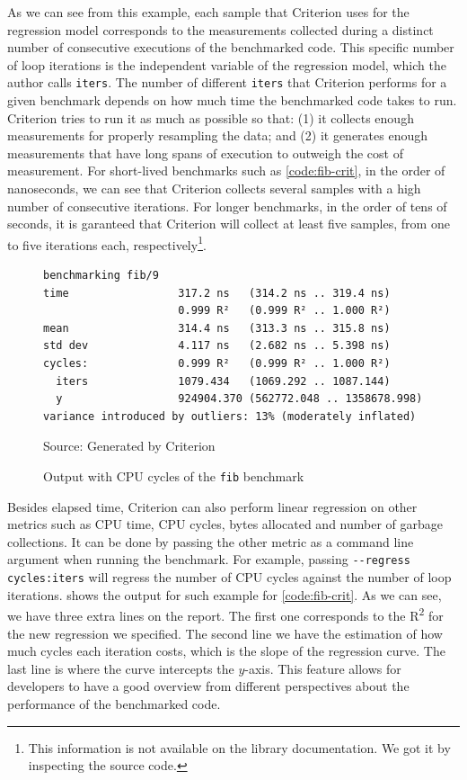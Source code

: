 As we can see from this example, each sample that Criterion uses for the regression model corresponds to the measurements collected during a distinct number of consecutive executions of the benchmarked code. This specific number of loop iterations is the independent variable of the regression model, which the author calls \texttt{iters}. The number of different \texttt{iters} that Criterion performs for a given benchmark depends on how much time the benchmarked code takes to run. Criterion tries to run it as much as possible so that: (1) it collects enough measurements for properly resampling the data; and (2) it generates enough measurements that have long spans of execution to outweigh the cost of measurement. For short-lived benchmarks such as \autoref{code:fib-crit}, in the order of nanoseconds, we can see that Criterion collects several samples with a high number of consecutive iterations. For longer benchmarks, in the order of tens of seconds, it is garanteed that Criterion will collect at least five samples, from one to five iterations each, respectively\footnote{This information is not available on the library documentation. We got it by inspecting the source code.}.

\begin{figure}[htp]
  \centering
  \caption{Output with CPU cycles of the \texttt{fib} benchmark}
  \begin{verbatim}
benchmarking fib/9
time                 317.2 ns   (314.2 ns .. 319.4 ns)
                     0.999 R²   (0.999 R² .. 1.000 R²)
mean                 314.4 ns   (313.3 ns .. 315.8 ns)
std dev              4.117 ns   (2.682 ns .. 5.398 ns)
cycles:              0.999 R²   (0.999 R² .. 1.000 R²)
  iters              1079.434   (1069.292 .. 1087.144)
  y                  924904.370 (562772.048 .. 1358678.998)
variance introduced by outliers: 13% (moderately inflated)
  \end{verbatim}
  \footnotesize{Source: Generated by Criterion}
  \label{fig:fib-cycle-output}
\end{figure}

Besides elapsed time, Criterion can also perform linear regression on other metrics such as CPU time, CPU cycles, bytes allocated and number of garbage collections. It can be done by passing the other metric as a command line argument when running the benchmark. For example, passing \texttt{-{}-regress cycles:iters} will regress the number of CPU cycles against the number of loop iterations.  shows the output for such example for \autoref{code:fib-crit}. As we can see, we have three extra lines on the report. The first one corresponds to the R\textsuperscript{2} for the new regression we specified. The second line we have the estimation of how much cycles each iteration costs, which is the slope of the regression curve. The last line is where the curve intercepts the $y$-axis. This feature allows for developers to have a good overview from different perspectives about the performance of the benchmarked code.

